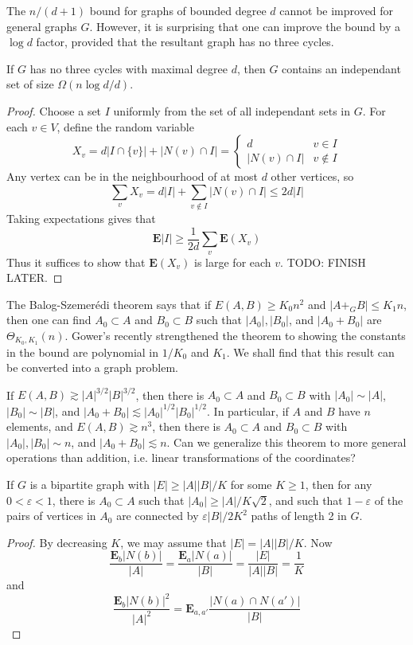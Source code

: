 The $n/(d+1)$ bound for graphs of bounded degree $d$ cannot be improved for general graphs $G$. However, it is surprising that one can improve the bound by a $\log d$ factor, provided that the resultant graph has no three cycles.

\begin{theorem}
    If $G$ has no three cycles with maximal degree $d$, then $G$ contains an independant set of size $\Omega(n \log d / d)$.
\end{theorem}
\begin{proof}
    Choose a set $I$ uniformly from the set of all independant sets in $G$. For each $v \in V$, define the random variable
    \[ X_v = d |I \cap \{ v \}| + |N(v) \cap I| = \begin{cases} d & v \in I \\ |N(v) \cap I| & v \not \in I \end{cases} \]
    Any vertex can be in the neighbourhood of at most $d$ other vertices, so
    \[ \sum_v X_v = d|I| + \sum_{v \not \in I} |N(v) \cap I| \leq 2d |I| \]
    Taking expectations gives that
    \[ \mathbf{E} |I| \geq \frac{1}{2d} \sum_v \mathbf{E}(X_v) \]
    Thus it suffices to show that $\mathbf{E}(X_v)$ is large for each $v$. TODO: FINISH LATER.
\end{proof}

The Balog-Szemer\'{e}di theorem says that if $E(A,B) \geq K_0 n^2$ and $|A +_G B| \leq K_1 n$, then one can find $A_0 \subset A$ and $B_0 \subset B$ such that $|A_0|, |B_0|$, and $|A_0 + B_0|$ are $\Theta_{K_0,K_1}(n)$. Gower's recently strengthened the theorem to showing the constants in the bound are polynomial in $1/K_0$ and $K_1$. We shall find that this result can be converted into a graph problem.

If $E(A,B) \gtrsim |A|^{3/2} |B|^{3/2}$, then there is $A_0 \subset A$ and $B_0 \subset B$ with $|A_0| \sim |A|$, $|B_0| \sim |B|$, and $|A_0 + B_0| \lesssim |A_0|^{1/2} |B_0|^{1/2}$. In particular, if $A$ and $B$ have $n$ elements, and $E(A,B) \gtrsim n^3$, then there is $A_0 \subset A$ and $B_0 \subset B$ with $|A_0|, |B_0| \sim n$, and $|A_0 + B_0| \lesssim n$. Can we generalize this theorem to more general operations than addition, i.e. linear transformations of the coordinates?

\begin{lemma}
    If $G$ is a bipartite graph with $|E| \geq |A||B|/K$ for some $K \geq 1$, then for any $0 < \varepsilon < 1$, there is $A_0 \subset A$ such that $|A_0| \geq |A|/K \sqrt{2}$, and such that $1 - \varepsilon$ of the pairs of vertices in $A_0$ are connected by $\varepsilon |B|/ 2K^2$ paths of length 2 in $G$.
\end{lemma}
\begin{proof}
    By decreasing $K$, we may assume that $|E| = |A||B|/K$. Now
    \[ \frac{\mathbf{E}_b |N(b)|}{|A|} = \frac{\mathbf{E}_a |N(a)|}{|B|} = \frac{|E|}{|A||B|} = \frac{1}{K} \]
    and
    \[ \frac{\mathbf{E}_b |N(b)|^2}{|A|^2}  = \mathbf{E}_{a,a'} \frac{|N(a) \cap N(a')|}{|B|} \]
\end{proof}

